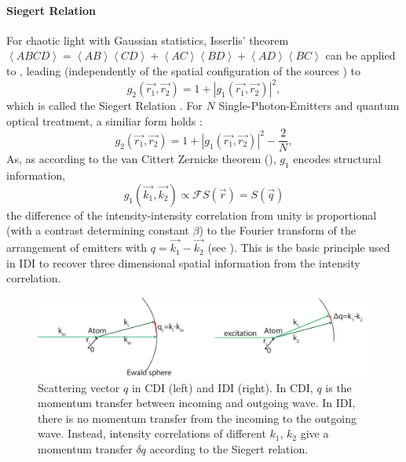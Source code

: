 \paragraph{Siegert Relation}
For chaotic light with Gaussian statistics, Isserlis' theorem 
$\left<ABCD\right>=\left<AB\right>\left<CD\right>+\left<AC\right>\left<BD\right>+\left<AD\right>\left<BC\right>$ can be applied to , leading  (independently of the spatial configuration of the sources ) to
\begin{equation}
	g_2(\vec{r_1},\vec{r_2}) = 1+ |g_1(\vec{r_1},\vec{r_2}) |^2 ,
\end{equation}
which is called the Siegert Relation \cite{ou2017}.
For $N$ Single-Photon-Emitters and quantum optical treatment,  a similiar form holds \cite{classen2017}:
\begin{equation}
	g_2(\vec{r_1},\vec{r_2}) = 1+ |g_1(\vec{r_1},\vec{r_2}) |^2 - \frac{2}{N} ,
\end{equation}
As, as according to the van Cittert Zernicke theorem (), $g_1$ encodes structural information, 
\begin{equation}
	g_1(\vec{k_1},\vec{k_2}) \propto \mathscr{F}S(\vec{r}) = S(\vec{q})
\end{equation}
the difference of the intensity-intensity correlation from unity is proportional (with a contrast determining constant $\beta$) to the Fourier transform of the arrangement of emitters with $q=\vec{k_1}-\vec{k_2}$ (see ).
This is the basic principle used in IDI to recover three dimensional spatial information from the intensity correlation.
\begin{figure}
	\centering
	\includegraphics[width=0.9\linewidth]{images/scatteringvectors.pdf}
	\caption[Scattering Vectors]{Scattering vector $q$ in CDI (left) and IDI (right). In CDI, $q$ is the momentum transfer between incoming and outgoing wave. In IDI, there is no momentum transfer from the incoming to the outgoing wave. Instead, intensity correlations of different $k_1$, $k_2$ give a momentum transfer $\delta q$ according to the Siegert relation.}
	\label{fig:scatteringvectors}
	
\end{figure}

